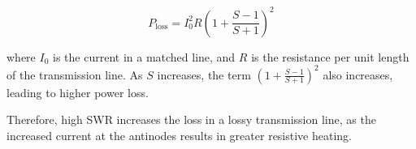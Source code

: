 \[
P_{\text{loss}} = I_0^2 R \left(1 + \frac{S - 1}{S + 1}\right)^2
\]

where \(I_0\) is the current in a matched line, and \(R\) is the resistance per unit length of the transmission line. As \(S\) increases, the term \(\left(1 + \frac{S - 1}{S + 1}\right)^2\) also increases, leading to higher power loss.

Therefore, high SWR increases the loss in a lossy transmission line, as the increased current at the antinodes results in greater resistive heating.

